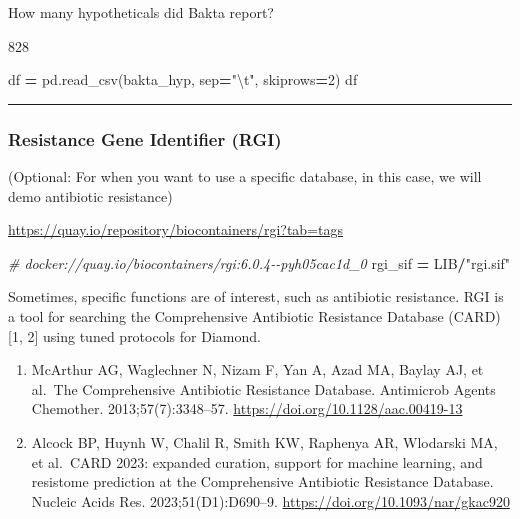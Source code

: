 \documentclass[
]{book}
\newenvironment{Shaded}{\begin{snugshade}}{\end{snugshade}}
\newcommand{\CharTok}[1]{\textcolor[rgb]{0.31,0.60,0.02}{#1}}
\newcommand{\CommentTok}[1]{\textcolor[rgb]{0.56,0.35,0.01}{\textit{#1}}}
\newcommand{\DecValTok}[1]{\textcolor[rgb]{0.00,0.00,0.81}{#1}}
\newcommand{\NormalTok}[1]{#1}
\newcommand{\OperatorTok}[1]{\textcolor[rgb]{0.81,0.36,0.00}{\textbf{#1}}}
\newcommand{\StringTok}[1]{\textcolor[rgb]{0.31,0.60,0.02}{#1}}
\providecommand{\tightlist}{%
  \setlength{\itemsep}{0pt}\setlength{\parskip}{0pt}}
\begin{document}
How many hypotheticals did Bakta report?

828

\begin{Shaded}
\begin{Highlighting}[numbers=left,,]
\NormalTok{df }\OperatorTok{=}\NormalTok{ pd.read\_csv(bakta\_hyp, sep}\OperatorTok{=}\StringTok{"}\CharTok{\textbackslash{}t}\StringTok{"}\NormalTok{, skiprows}\OperatorTok{=}\DecValTok{2}\NormalTok{)}
\NormalTok{df}
\end{Highlighting}
\end{Shaded}

\begin{center}\rule{0.5\linewidth}{0.5pt}\end{center}

\subsubsection{Resistance Gene Identifier (RGI)}\label{resistance-gene-identifier-rgi}

(Optional: For when you want to use a specific database, in this case, we will demo antibiotic resistance)

\url{https://quay.io/repository/biocontainers/rgi?tab=tags}

\begin{Shaded}
\begin{Highlighting}[numbers=left,,]
\CommentTok{\# docker://quay.io/biocontainers/rgi:6.0.4{-}{-}pyh05cac1d\_0}
\NormalTok{rgi\_sif }\OperatorTok{=}\NormalTok{ LIB}\OperatorTok{/}\StringTok{"rgi.sif"}
\end{Highlighting}
\end{Shaded}

Sometimes, specific functions are of interest, such as antibiotic resistance.
RGI is a tool for searching the Comprehensive Antibiotic Resistance Database (CARD) {[}1, 2{]} using tuned protocols for Diamond.

\begin{enumerate}
\def\labelenumi{\arabic{enumi}.}
\tightlist
\item
  McArthur AG, Waglechner N, Nizam F, Yan A, Azad MA, Baylay AJ, et al.~The Comprehensive Antibiotic Resistance Database. Antimicrob Agents Chemother. 2013;57(7):3348--57. \url{https://doi.org/10.1128/aac.00419-13}
\item
  Alcock BP, Huynh W, Chalil R, Smith KW, Raphenya AR, Wlodarski MA, et al.~CARD 2023: expanded curation, support for machine learning, and resistome prediction at the Comprehensive Antibiotic Resistance Database. Nucleic Acids Res. 2023;51(D1):D690--9. \url{https://doi.org/10.1093/nar/gkac920}
\end{enumerate}
\end{document}

